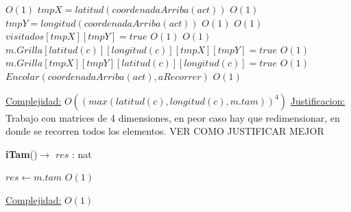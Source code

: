 \begin{Algoritmos}
\begin{algorithmic}[1]
\State $ $

      \Comment $O(1)$
\State $tmpX = latitud(coordenadaArriba(act))$   \Comment $O(1)$
\State $tmpY = longitud(coordenadaArriba(act))$  \Comment $O(1)$
    \Comment $O(1)$
\State $visitados[tmpX][tmpY] = true$    \Comment $O(1)$
	 	\Comment $O(1)$
		\State $m.Grilla[latitud(c)][longitud(c)][tmpX][tmpY] = true$ \Comment $O(1)$
		\State $m.Grilla[tmpX][tmpY][latitud(c)][longitud(c)] = true$ \Comment $O(1)$
		\State $Encolar(coordenadaArriba(act), aRecorrer)$ \Comment $O(1)$		
	\EndIf
\EndIf
\EndIf


\EndWhile

\medskip
\Statex \underline{Complejidad:} $O((max(latitud(c), longitud(c), m.tam))^4)$
\Statex \underline{Justificacion:} Trabajo con matrices de 4 dimensiones, en peor caso hay que redimensionar, en donde se recorren todos los elementos. VER COMO JUSTIFICAR MEJOR


\end{algorithmic}



\begin{algorithm}[H]
{\textbf{iTam}()$\to$ $res$ : nat}
\begin{algorithmic}[1]

\State $res \gets m.tam$ \Comment $O(1)$

\medskip
\Statex \underline{Complejidad:} $O(1)$

\end{algorithmic}
\end{algorithm}


  
\end{Algoritmos}